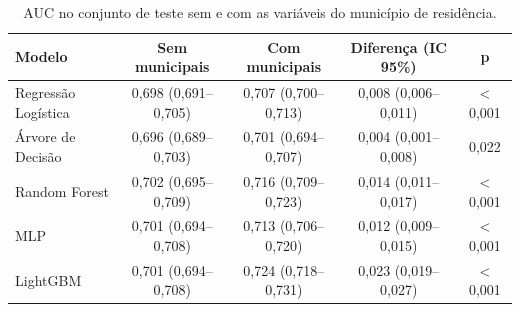 \begin{table}[H]
    \centering
    \caption{AUC no conjunto de teste sem e com as variáveis do município de residência.}
    \label{tab-res-cenarios}
    \footnotesize
    \renewcommand{\arraystretch}{1.2}
    \setlength{\tabcolsep}{4pt}
    \begin{tabular}{l c c c c}
        \hline
        \textbf{Modelo} & \textbf{Sem municipais} & \textbf{Com municipais} & \textbf{Diferença (IC 95\%)} & \textbf{p} \\
        \hline
        Regressão Logística & 0,698 (0,691–0,705) & 0,707 (0,700–0,713) & 0,008 (0,006–0,011) & < 0,001 \\
        Árvore de Decisão & 0,696 (0,689–0,703) & 0,701 (0,694–0,707) & 0,004 (0,001–0,008) & 0,022 \\
        Random Forest & 0,702 (0,695–0,709) & 0,716 (0,709–0,723) & 0,014 (0,011–0,017) & < 0,001 \\
        MLP & 0,701 (0,694–0,708) & 0,713 (0,706–0,720) & 0,012 (0,009–0,015) & < 0,001 \\
        LightGBM & 0,701 (0,694–0,708) & 0,724 (0,718–0,731) & 0,023 (0,019–0,027) & < 0,001 \\
        \hline
    \end{tabular}
\end{table}
